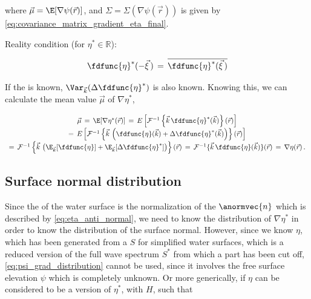 where $\vec{\mu} = \E[\nabla\psi(\vec{r})]$, and $\Sigma = \Sigma(\nabla\psi(\vec{r}))$ is given by \eqref{eq:covariance_matrix_gradient_eta_final}.

\comment
{
\HRule

Reality condition (for $\eta^*\in\mathbb{R}$):

\begin{equation}
\fdfunc{\eta}^*(-\vec{\xi}\,) \,=\, \overline{\fdfunc{\eta}^*(\vec{\xi}\,)}
\end{equation}

\HRule

If the  is known, $\Var_{\vec{k}}(\Delta\fdfunc{\eta}^*)$ is also known. Knowing this, we can calculate the mean value $\vec{\mu}$ of $\nabla\eta^*$,

\begin{equation}
\renewcommand*{\arraystretch}{1.5}
\begin{array}{c}
\vec{\mu} \,=\, \E[\nabla\eta^*(\vec{r})] \,=\, E\left[\mathcal{F}^{-1}\left\{\vec{k}\,\fdfunc{\eta}^*(\vec{k})\right\}(\vec{r})\right] \\
=\, E\left[\mathcal{F}^{-1}\left\{\vec{k}\,\left(\fdfunc{\eta}(\vec{k})+\Delta\fdfunc{\eta}^*(\vec{k})\right)\right\}(\vec{r})\right] \\
=\, \mathcal{F}^{-1}\left\{\vec{k}\,\left(\E_{\vec{k}}[\fdfunc{\eta}]+\E_{\vec{k}}[\Delta\fdfunc{\eta}^*]\right)\right\}(\vec{r}) \,=\, \mathcal{F}^{-1}\{\vec{k}\,\fdfunc{\eta}(\vec{k})\}(\vec{r}) \,=\, \nabla\eta(\vec{r})\,.
\end{array}
\end{equation}

\HRule
}

\subsection{Surface normal distribution}

Since the  of the water surface is the normalization of the  $\anormvec{n}$ which is described by \eqref{eq:eta_anti_normal}, we need to know the distribution of $\nabla\eta^*$ in order to know the distribution of the surface normal. However, since we know $\eta$, which has been generated from a  $S$ for simplified water surfaces, which is a reduced version of the full wave spectrum $S^*$ from which a part has been cut off, \eqref{eq:psi_grad_distribution} cannot be used, since it involves the free surface elevation $\psi$ which is completely unknown. Or more generically, if $\eta$ can be considered to be a  version of $\eta^*$, with  $H$, such that

